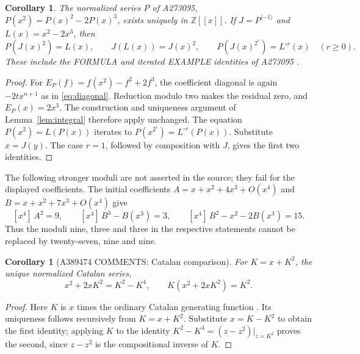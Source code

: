 \documentclass[11pt]{article}
\newtheorem{corollary}[theorem]{Corollary}
\newtheorem*{consequence}{Corollary}
\newcommand{\Z}{\mathbb Z}
\newcommand{\coef}[2]{[x^{#1}]\,#2}
\begin{document}
\begin{corollary}\label{cor:273}
The normalized series $P$ of A273095,
$P(x^2)=P(x)^2-2P(x)^3$, exists uniquely in $\Z[[x]]$.
If $J=P^{\langle-1\rangle}$ and $L(x)=x^2-2x^3$, then
\[
 P(J(x)^2)=L(x),\qquad J(L(x))=J(x)^2,\qquad
 P(J(x)^{2^r})=L^{\circ r}(x)\quad(r\ge0).
\]
These include the FORMULA and iterated EXAMPLE identities of A273095
\cite{h273}.
\end{corollary}
\begin{proof}
For $E_P(f)=f(x^2)-f^2+2f^3$, the coefficient diagonal is again
$-2t x^{n+1}$ as in \eqref{eq:diagonal}. Reduction modulo two makes
the residual zero, and $E_P(x)=2x^3$. The construction and uniqueness
argument of Lemma~\ref{lem:integral} therefore apply unchanged.
The equation $P(x^2)=L(P(x))$ iterates to
$P(x^{2^r})=L^{\circ r}(P(x))$. Substitute $x=J(y)$.
The case $r=1$, followed by composition with $J$, gives the first
two identities.
\end{proof}

The following stronger moduli are not asserted in the source;
they fail for the displayed coefficients.
The initial coefficients $A=x+x^2+4x^3+O(x^4)$ and
$B=x+x^2+7x^3+O(x^4)$ give
\[
 \coef{4}{A^2}=9,\qquad
 \coef{4}{B^3-B(x^3)}=3,\qquad
 \coef{4}{B^2-x^2-2B(x^3)}=15.
\]
Thus the moduli nine, three and three in the respective statements
cannot be replaced by twenty-seven, nine and nine.

\begin{consequence}[A389474 COMMENTS: Catalan comparison]
For $K=x+K^2$, the unique normalized Catalan series,
\[
 x^2+2xK^2=K^2-K^4,\qquad K(x^2+2xK^2)=K^2.
\]
\end{consequence}
\begin{proof}
Here $K$ is $x$ times the ordinary Catalan generating function
\cite{catalan}. Its uniqueness follows recursively from $K=x+K^2$.
Substitute $x=K-K^2$ to obtain the first identity; applying $K$ to
the identity $K^2-K^4=(z-z^2)|_{z=K^2}$ proves the second, since
$z-z^2$ is the compositional inverse of $K$.
\end{proof}
\end{document}
